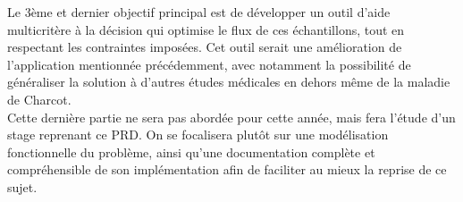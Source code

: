 \documentclass{polytech/polytech}
\numberwithin{figure}{chapter}
\begin{document}
\begin{flushleft}
Le 3ème et dernier objectif principal est de développer un outil d'aide multicritère à la décision qui optimise le flux de ces échantillons, tout en respectant les contraintes imposées.
Cet outil serait une amélioration de l'application mentionnée précédemment, avec notamment la possibilité de généraliser la solution à d'autres études médicales en dehors même de la maladie de Charcot.\\
Cette dernière partie ne sera pas abordée pour cette année, mais fera l'étude d'un stage reprenant ce PRD.
On se focalisera plutôt sur une modélisation fonctionnelle du problème, ainsi qu'une documentation complète et compréhensible de son implémentation afin de faciliter au mieux la reprise de ce sujet.  
\end{flushleft}

\pagebreak
\end{document}
